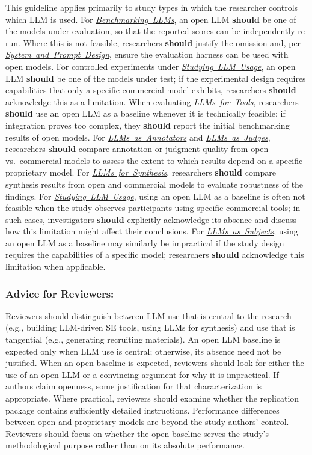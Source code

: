 \documentclass[smallextended]{svjour3}
\newcommand{\should}{\textbf{should}\xspace}
\newcommand{\annotators}{\hyperref[sec:llms-as-annotators]{\mbox{\emph{LLMs as Annotators}}}\xspace}
\newcommand{\judges}{\hyperref[sec:llms-as-judges]{\mbox{\emph{LLMs as Judges}}}\xspace}
\newcommand{\synthesis}{\hyperref[sec:llms-for-synthesis]{\mbox{\emph{LLMs for Synthesis}}}\xspace}
\newcommand{\subjects}{\hyperref[sec:llms-as-subjects]{\mbox{\emph{LLMs as Subjects}}}\xspace}
\newcommand{\llmusage}{\hyperref[sec:studying-llm-usage-in-software-engineering]{\mbox{\emph{Studying LLM Usage}}}\xspace}
\newcommand{\newtools}{\hyperref[sec:llms-for-new-software-engineering-tools]{\mbox{\emph{LLMs for Tools}}}\xspace}
\newcommand{\benchmarkingtasks}{\hyperref[sec:benchmarking-llms-for-software-engineering-tasks]{\mbox{\emph{Benchmarking LLMs}}}\xspace}
\newcommand{\annotators}{\href{/study-types/annotators/}{\emph{LLMs as Annotators}}\xspace}
\newcommand{\judges}{\href{/study-types/judges/}{\emph{LLMs as Judges}}\xspace}
\newcommand{\synthesis}{\href{/study-types/synthesis/}{\emph{LLMs for Synthesis}}\xspace}
\newcommand{\subjects}{\href{/study-types/subjects/}{\emph{LLMs as Subjects}}\xspace}
\newcommand{\llmusage}{\href{/study-types/usage/}{\emph{Studying LLM Usage}}\xspace}
\newcommand{\newtools}{\href{/study-types/tools/}{\emph{LLMs for Tools}}\xspace}
\newcommand{\benchmarkingtasks}{\href{/study-types/benchmarking/}{\emph{Benchmarking LLMs}}\xspace}
\newcommand{\design}{\hyperref[sec:report-system-and-prompt-design]{\mbox{\emph{System and Prompt Design}}}\xspace}
\newcommand{\design}{\href{/guidelines/design/}{\emph{System and Prompt Design}}\xspace}
\newcommand{\guidelinesubsubsection}[1]{\subsubsection{\bfseries #1:}}
\newcommand{\guidelinesubsubsection}[1]{\subsubsection{#1}}
\begin{document}
This guideline applies primarily to study types in which the researcher controls which LLM is used.
For \benchmarkingtasks, an open LLM \should be one of the models under evaluation, so that the reported scores can be independently re-run. Where this is not feasible, researchers \should justify the omission and, per \design, ensure the evaluation harness can be used with open models.
For controlled experiments under \llmusage, an open LLM \should be one of the models under test; if the experimental design requires capabilities that only a specific commercial model exhibits, researchers \should acknowledge this as a limitation.
When evaluating \newtools, researchers \should use an open LLM as a baseline whenever it is technically feasible; if integration proves too complex, they \should report the initial benchmarking results of open models.
For \annotators and \judges, researchers \should compare annotation or judgment quality from open vs.\ commercial models to assess the extent to which results depend on a specific proprietary model.
For \synthesis, researchers \should compare synthesis results from open and commercial models to evaluate robustness of the findings.
For \llmusage, using an open LLM as a baseline is often not feasible when the study observes participants using specific commercial tools; in such cases, investigators \should explicitly acknowledge its absence and discuss how this limitation might affect their conclusions.
For \subjects, using an open LLM as a baseline may similarly be impractical if the study design requires the capabilities of a specific model; researchers \should acknowledge this limitation when applicable.

\guidelinesubsubsection{Advice for Reviewers}

Reviewers should distinguish between LLM use that is central to the research (e.g., building LLM-driven SE tools, using LLMs for synthesis) and use that is tangential (e.g., generating recruiting materials). An open LLM baseline is expected only when LLM use is central; otherwise, its absence need not be justified.
When an open baseline is expected, reviewers should look for either the use of an open LLM or a convincing argument for why it is impractical. If authors claim openness, some justification for that characterization is appropriate. Where practical, reviewers should examine whether the replication package contains sufficiently detailed instructions.
Performance differences between open and proprietary models are beyond the study authors' control. Reviewers should focus on whether the open baseline serves the study's methodological purpose rather than on its absolute performance.
\end{document}
